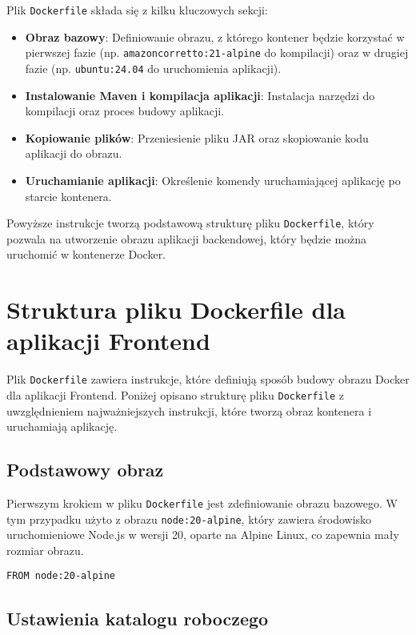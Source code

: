 Plik \texttt{Dockerfile} składa się z kilku kluczowych sekcji:
\begin{itemize}
    \item \textbf{Obraz bazowy}: Definiowanie obrazu, z którego kontener będzie korzystać w pierwszej fazie (np. \texttt{amazoncorretto:21-alpine} do kompilacji) oraz w drugiej fazie (np. \texttt{ubuntu:24.04} do uruchomienia aplikacji).
    \item \textbf{Instalowanie Maven i kompilacja aplikacji}: Instalacja narzędzi do kompilacji oraz proces budowy aplikacji.
    \item \textbf{Kopiowanie plików}: Przeniesienie pliku JAR oraz skopiowanie kodu aplikacji do obrazu.
    \item \textbf{Uruchamianie aplikacji}: Określenie komendy uruchamiającej aplikację po starcie kontenera.
\end{itemize}

Powyższe instrukcje tworzą podstawową strukturę pliku \texttt{Dockerfile}, który pozwala na utworzenie obrazu aplikacji backendowej, który będzie można uruchomić w kontenerze Docker.

\section{Struktura pliku Dockerfile dla aplikacji Frontend}

Plik \texttt{Dockerfile} zawiera instrukcje, które definiują sposób budowy obrazu Docker dla aplikacji Frontend. Poniżej opisano strukturę pliku \texttt{Dockerfile} z uwzględnieniem najważniejszych instrukcji, które tworzą obraz kontenera i uruchamiają aplikację.

\subsection{Podstawowy obraz}

Pierwszym krokiem w pliku \texttt{Dockerfile} jest zdefiniowanie obrazu bazowego. W tym przypadku użyto z obrazu \texttt{node:20-alpine}, który zawiera środowisko uruchomieniowe Node.js w wersji 20, oparte na Alpine Linux, co zapewnia mały rozmiar obrazu.

\begin{verbatim}
FROM node:20-alpine
\end{verbatim}

\subsection{Ustawienia katalogu roboczego}

